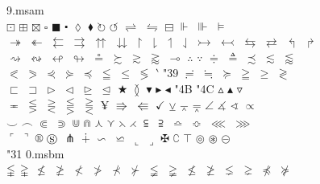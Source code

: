 \documentclass{article}
\begin{document}
9.msam\\
\noindent $\boxdot$ $\boxplus$ $\boxtimes$ $\square$ $\blacksquare$ $\centerdot$ $\lozenge$ $\blacklozenge$ $\circlearrowright$ $\circlearrowleft$ $\rightleftharpoons$ $\leftrightharpoons$ $\boxminus$ $\Vdash$ $\Vvdash$ $\vDash$\\
$\twoheadrightarrow$ $\twoheadleftarrow$ $\leftleftarrows$ $\rightrightarrows$ $\upuparrows$ $\downdownarrows$ $\upharpoonright$ $\downharpoonright$ $\upharpoonleft$ $\downharpoonleft$ $\rightarrowtail$ $\leftarrowtail$ $\leftrightarrows$ $\rightleftarrows$ $\Lsh$ $\Rsh$\\
$\rightsquigarrow$ $\leftrightsquigarrow$ $\looparrowleft$ $\looparrowright$ $\circeq$ $\succsim$ $\gtrsim$ $\gtrapprox$ $\multimap$ $\therefore$ $\because$ $\doteqdot$ $\triangleq$ $\precsim$ $\lesssim$ $\lessapprox$\\
$\eqslantless$ $\eqslantgtr$ $\curlyeqprec$ $\curlyeqsucc$ $\preccurlyeq$ $\leqq$ $\leqslant$ $\lessgtr$ $\backprime$ \selectfont\char"39 $\risingdotseq$ $\fallingdotseq$ $\succcurlyeq$ $\geqq$ $\geqslant$ $\gtrless$\\
$\sqsubset$ $\sqsupset$ $\vartriangleright$ $\vartriangleleft$ $\trianglerighteq$ $\trianglelefteq$ $\bigstar$ $\between$ $\blacktriangledown$ $\blacktriangleright$ $\blacktriangleleft$ \selectfont\char"4B  \selectfont\char"4C $\vartriangle$ $\blacktriangle$ $\triangledown$ \\
$\eqcirc$ $\lesseqgtr$ $\gtreqless$ $\lesseqqgtr$ $\gtreqqless$ $\yen$ $\Rrightarrow$ $\Lleftarrow$ $\checkmark$ $\veebar$ $\barwedge$ $\doublebarwedge$ $\angle$ $\measuredangle$ $\sphericalangle$ $\varpropto$\\
$\smallsmile$ $\smallfrown$ $\Subset$ $\Supset$ $\Cup$ $\Cap$ $\curlywedge$ $\curlyvee$ $\leftthreetimes$ $\rightthreetimes$ $\subseteqq$ $\supseteqq$ $\bumpeq$ $\Bumpeq$ $\lll$ $\ggg$\\
$\ulcorner$ $\urcorner$ $\circledR$ $\circledS$ $\pitchfork$ $\dotplus$ $\backsim$ $\backsimeq$ $\llcorner$ $\lrcorner$ $\maltese$ $\complement$ $\intercal$ $\circledcirc$ $\circledast$ $\circleddash$\\
\selectfont\char"31 0.msbm\\
\noindent $\lvertneqq$ $\gvertneqq$ $\nleq$ $\ngeq$ $\nless$ $\ngtr$ $\nprec$ $\nsucc$ $\lneqq$ $\gneqq$ $\nleqslant$ $\ngeqslant$ $\lneq$ $\gneq$ $\npreceq$ $\nsucceq$\\
\end{document}
